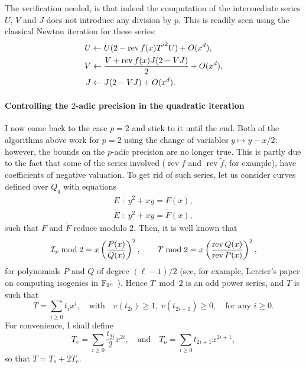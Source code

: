 \documentclass{article}
\DeclareMathOperator{\rev}{rev}
\begin{document}
The verification needed, is that indeed the computation of the
intermediate series $U$, $V$ and $J$ does not introduce any division
by $p$. This is readily seen using the classical Newton iteration for
these series:
\begin{align}
  U &\la U(2 - \rev f(x){T'}^2U)  + O(x^d),\\
  V &\la \frac{V + \rev f(x)J(2 - VJ)}{2}  + O(x^d),\\
  J &\la J(2-VJ)  + O(x^d).
\end{align}


\paragraph{Controlling the $2$-adic precision in the quadratic iteration}
I now come back to the case $p=2$ and stick to it until the end. Both
of the algorithms above work for $p=2$ using the change of variables
$y\mapsto y-x/2$; however, the bounds on the $p$-adic precision are no
longer true. This is partly due to the fact that some of the series
involved ($\rev f$ and $\rev\tilde{f}$, for example), have
coefficients of negative valuation. To get rid of such series, let us
consider curves defined over $Q_q$ with equations
\begin{equation}
  \label{eq:16}
  \begin{gathered}
    E \;:\; y^2 + xy = F(x),\\
    \tilde{E} \;:\; y^2 + xy = \tilde{F}(x),
  \end{gathered}
\end{equation}
such that $F$ and $\tilde{F}$ reduce modulo $2$. Then, it is well
known that
\begin{equation}
  \label{eq:34}
  \I_x \bmod 2 = x\left(\frac{P(x)}{Q(x)}\right)^2, \qquad
  T \bmod 2 = x\left(\frac{\rev Q(x)}{\rev P(x)}\right)^2,
\end{equation}
for polynomials $P$ and $Q$ of degree $(\ell-1)/2$ (see, for example,
Lercier's paper on computing isogenies in $\mathbb{F}_{2^n}$
\cite{lercier96}). Hence $T\bmod 2$ is an odd power series, and $T$ is
such that
\begin{equation}
  \label{eq:35}
  T = \sum_{i\ge0}t_ix^i, \quad\text{with}\quad
  v(t_{2i})\ge1,\;v(t_{2i+1})\ge0, \quad\text{for any $i\ge0$}.
\end{equation}
For convenience, I shall define
\begin{equation}
  \label{eq:36}
  T_e = \sum_{i\ge0}\frac{t_{2i}}{2}x^{2i}, \quad\text{and}\quad
  T_o = \sum_{i\ge0}t_{2i+1}x^{2i+1},
\end{equation}
so that $T=T_o+2T_e$.
\end{document}
